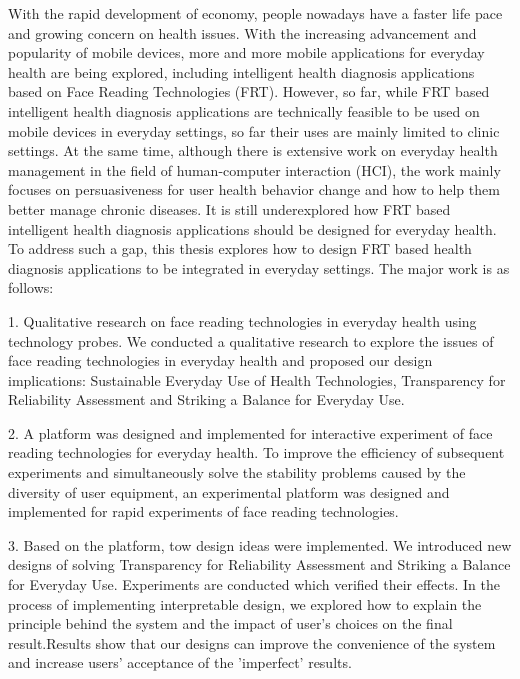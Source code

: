 \documentclass[type=master]{fduthesis}
\begin{document}
\begin{abstract*}

With the rapid development of economy, people nowadays have a faster life pace and growing concern on health issues. With the increasing advancement and popularity of mobile devices, more and more mobile applications for everyday health are being explored, including intelligent health diagnosis applications based on Face Reading Technologies (FRT). However, so far, while FRT based intelligent health diagnosis applications are technically feasible to be used on mobile devices in everyday settings, so far their uses are mainly limited to clinic settings. At the same time, although there is extensive work on everyday health management in the field of human-computer interaction (HCI), the work mainly focuses on persuasiveness for user health behavior change and how to help them better manage chronic diseases. It is still underexplored how FRT based intelligent health diagnosis applications should be designed for everyday health.
To address such a gap, this thesis explores how to design FRT based health diagnosis applications to be integrated in everyday settings. The major work is as follows: 

1.	Qualitative research on face reading technologies in everyday health using technology probes. We conducted a qualitative research to explore the issues of face reading technologies in everyday health and proposed our design implications: Sustainable Everyday Use of Health Technologies, Transparency for Reliability Assessment and Striking a Balance for Everyday Use. 

2.	A platform was designed and implemented for interactive experiment of face reading technologies for everyday health. To improve the efficiency of subsequent experiments and simultaneously solve the stability problems caused by the diversity of user equipment, an experimental platform was designed and implemented for rapid experiments of face reading technologies. 

3.	Based on the platform, tow design ideas were implemented. We introduced new designs of solving Transparency for Reliability Assessment and Striking a Balance for Everyday Use. Experiments are conducted which verified their effects. In the process of implementing interpretable design, we explored how to explain the principle behind the system and the impact of user’s choices on the final result.Results show that our designs can improve the convenience of the system and increase users' acceptance of the 'imperfect' results.


\end{abstract*}
\end{document}
